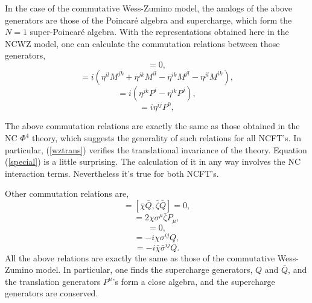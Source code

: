 \documentclass[a4paper,a4paper]{article}
\begin{document}
In the case of the commutative Wess-Zumino model, the analogs of the above generators are 
those of the Poincar\'{e} algebra and supercharge, which form the $N=1$ super-Poincar\'{e} 
algebra. With the representations obtained here in the NCWZ model, 
one can calculate the commutation relations between those generators, 
\begin{equation}
[P^\mu,P^\nu] =  0,\label{wztrans}
\end{equation}
\begin{equation}
[M^{ij},M^{kl}]  = i(\eta^{il}M^{jk}+\eta^{jk}M^{il}-\eta^{ik}M^{jl}-\eta^{jl}M^{ik}),
\end{equation}
\begin{equation}
[M^{ij},P^k] = i(\eta^{jk}P^i-\eta^{ik}P^j),
\end{equation}
\begin{equation}
[M^{0i},P^j]  =  i\eta^{ij}P^0,\label{special}
\end{equation}

The above commutation relations are exactly the same as those obtained in the NC 
$\Phi^4$ theory, which suggests the generality of such relations for all NCFT's. 
In particular, (\ref{wztrans}) verifies the translational invariance
of the theory. Equation (\ref{special}) is a little surprising. The calculation of
it in any way involves the NC interaction terms. Nevertheless it's 
true for both NCFT's.

Other commutation relations are,
\begin{equation}
[\chi Q,\zeta Q] = [\bar{\chi} \bar{Q},\bar{\zeta} \bar{Q}] = 0,\label{QQ}
\end{equation}
\begin{equation}
[\chi Q,\bar{\zeta} \bar{Q}] = 2\chi\sigma^\mu\bar{\zeta}P_\mu,\label{QQbar}
\end{equation}
\begin{equation}
[P^\mu, \chi Q] = 0,\label{PQ}
\end{equation}
\begin{equation}
[M^{ij}, \chi Q] = -i\chi \sigma^{ij}Q,
\end{equation}
\begin{equation}
[M^{ij}, \bar{\chi} \bar{Q}] = -i\bar{\chi} \bar{\sigma}^{ij}\bar{Q}.
\end{equation}
All the above relations are exactly the same as 
those of the commutative Wess-Zumino model. In particular, one 
finds the supercharge generators, $Q$ and $\bar{Q}$, and the translation
generators $P^\mu$'s form a close algebra, and the supercharge generators 
are conserved. 
\end{document}

